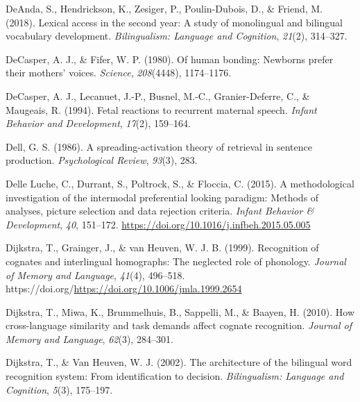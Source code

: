 \documentclass[
  12pt,
  b5paperpaper,
  twoside]{scrreprt}
\newlength{\cslhangindent}
\newlength{\cslentryspacingunit} %
\newenvironment{CSLReferences}[2] %
 {%
  \setlength{\parindent}{0pt}
  \ifodd #1
  \let\oldpar\par
  \def\par{\hangindent=\cslhangindent\oldpar}
  \fi
  \setlength{\parskip}{#2\cslentryspacingunit}
 }%
 {}
\begin{document}
\begin{CSLReferences}{1}{0}
\leavevmode{}%
DeAnda, S., Hendrickson, K., Zesiger, P., Poulin-Dubois, D., \& Friend,
M. (2018). Lexical access in the second year: A study of monolingual and
bilingual vocabulary development. \emph{Bilingualism: Language and
Cognition}, \emph{21}(2), 314--327.

\leavevmode{}%
DeCasper, A. J., \& Fifer, W. P. (1980). Of human bonding: Newborns
prefer their mothers' voices. \emph{Science}, \emph{208}(4448),
1174--1176.

\leavevmode{}%
DeCasper, A. J., Lecanuet, J.-P., Busnel, M.-C., Granier-Deferre, C., \&
Maugeais, R. (1994). Fetal reactions to recurrent maternal speech.
\emph{Infant Behavior and Development}, \emph{17}(2), 159--164.

\leavevmode{}%
Dell, G. S. (1986). A spreading-activation theory of retrieval in
sentence production. \emph{Psychological Review}, \emph{93}(3), 283.

\leavevmode{}%
Delle Luche, C., Durrant, S., Poltrock, S., \& Floccia, C. (2015). A
methodological investigation of the intermodal preferential looking
paradigm: Methods of analyses, picture selection and data rejection
criteria. \emph{Infant Behavior \& Development}, \emph{40}, 151--172.
\url{https://doi.org/10.1016/j.infbeh.2015.05.005}

\leavevmode{}%
Dijkstra, T., Grainger, J., \& van Heuven, W. J. B. (1999). Recognition
of cognates and interlingual homographs: The neglected role of
phonology. \emph{Journal of Memory and Language}, \emph{41}(4),
496--518. https://doi.org/\url{https://doi.org/10.1006/jmla.1999.2654}

\leavevmode{}%
Dijkstra, T., Miwa, K., Brummelhuis, B., Sappelli, M., \& Baayen, H.
(2010). How cross-language similarity and task demands affect cognate
recognition. \emph{Journal of Memory and Language}, \emph{62}(3),
284--301.

\leavevmode{}%
Dijkstra, T., \& Van Heuven, W. J. (2002). The architecture of the
bilingual word recognition system: From identification to decision.
\emph{Bilingualism: Language and Cognition}, \emph{5}(3), 175--197.


\end{CSLReferences}
\end{document}
